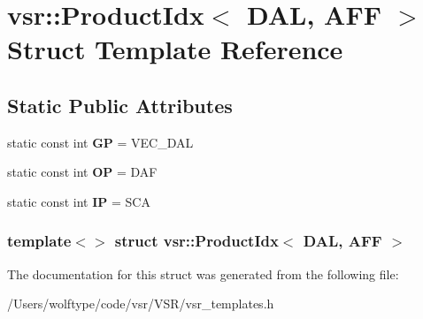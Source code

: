 \hypertarget{structvsr_1_1_product_idx_3_01_d_a_l_00_01_a_f_f_01_4}{\section{vsr\-:\-:Product\-Idx$<$ D\-A\-L, A\-F\-F $>$ Struct Template Reference}
\label{structvsr_1_1_product_idx_3_01_d_a_l_00_01_a_f_f_01_4}
}
\subsection*{Static Public Attributes}
\begin{DoxyCompactItemize}
\item 
\hypertarget{structvsr_1_1_product_idx_3_01_d_a_l_00_01_a_f_f_01_4_a4d5f05b40170cf55e85ce53f1e43e38b}{static const int {\bfseries G\-P} = V\-E\-C\-\_\-\-D\-A\-L}\label{structvsr_1_1_product_idx_3_01_d_a_l_00_01_a_f_f_01_4_a4d5f05b40170cf55e85ce53f1e43e38b}

\item 
\hypertarget{structvsr_1_1_product_idx_3_01_d_a_l_00_01_a_f_f_01_4_ae7f7daed30dca924ba09c9235a0a60f3}{static const int {\bfseries O\-P} = D\-A\-F}\label{structvsr_1_1_product_idx_3_01_d_a_l_00_01_a_f_f_01_4_ae7f7daed30dca924ba09c9235a0a60f3}

\item 
\hypertarget{structvsr_1_1_product_idx_3_01_d_a_l_00_01_a_f_f_01_4_aca128294d381bf693f23382b9c8c688a}{static const int {\bfseries I\-P} = S\-C\-A}\label{structvsr_1_1_product_idx_3_01_d_a_l_00_01_a_f_f_01_4_aca128294d381bf693f23382b9c8c688a}

\end{DoxyCompactItemize}
\subsubsection*{template$<$$>$ struct vsr\-::\-Product\-Idx$<$ D\-A\-L, A\-F\-F $>$}



The documentation for this struct was generated from the following file\-:\begin{DoxyCompactItemize}
\item 
/\-Users/wolftype/code/vsr/\-V\-S\-R/vsr\-\_\-templates.\-h\end{DoxyCompactItemize}
